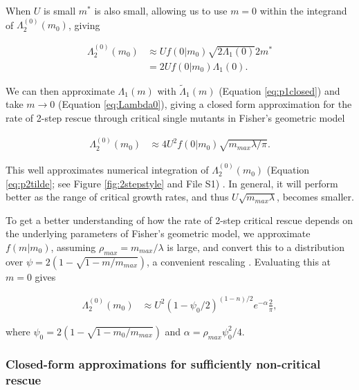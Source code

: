 \documentclass[9pt,twocolumn,twoside,lineno]{gsajnl}
\begin{document}
When $U$ is small $m^*$ is also small, allowing us to use $m = 0$ within the integrand of $\Lambda_2^{(0)}(m_0)$, giving 

\begin{equation}\label{eq:p20app1}
\begin{aligned}
\Lambda_2^{(0)}(m_0)
&\approx U f(0|m_0)  \sqrt{2\Lambda_1(0)} 2m^*\\
&= 2 U f(0|m_0) \Lambda_1(0).
\end{aligned}
\end{equation}

\noindent We can then approximate $\Lambda_1(m)$ with $\tilde{\Lambda}_1(m)$ (Equation \ref{eq:p1closed}) and take $m\rightarrow0$ (Equation \ref{eq:Lambda0}), giving a closed form approximation for the rate of 2-step rescue through critical single mutants in Fisher's geometric model

\begin{equation}\label{eq:p20app}
\begin{aligned}
\Lambda_2^{(0)}(m_0)
&\approx 4 U^2 f(0|m_0)  \sqrt{m_{max} \lambda/ \pi}.
\end{aligned}
\end{equation}

\noindent This well approximates numerical integration of $\Lambda_2^{(0)}(m_0)$  (Equation \ref{eq:p2tilde}; see Figure \ref{fig:2stepstyle} and File S1) .
In general, it will perform better as the range of critical growth rates, and thus $U \sqrt{m_{max} \lambda}$, becomes smaller.

To get a better understanding of how the rate of 2-step critical rescue depends on the underlying parameters of Fisher's geometric model, we approximate $f(m|m_0)$, assuming $\rho_{max} = m_{max}/\lambda$ is large, and convert this to a distribution over $\psi = 2(1-\sqrt{1-m/m_{max}})$, a convenient rescaling \citep[for details seeFile S1 and][]{Anciaux2018}.
Evaluating this at $m=0$ gives

\begin{equation}\label{eq:p20app2}
\begin{aligned}
\Lambda_2^{(0)}(m_0)
&\approx U^2 (1-\psi_0/2)^{(1-n)/2} e^{-\alpha} \frac{2}{\pi},
\end{aligned}
\end{equation}

\noindent where $\psi_0 = 2(1-\sqrt{1-m_0/m_{max}})$ and $\alpha = \rho_{max} \psi_0^2/4$.

\subsubsection{Closed-form approximations for sufficiently non-critical rescue}
\end{document}
